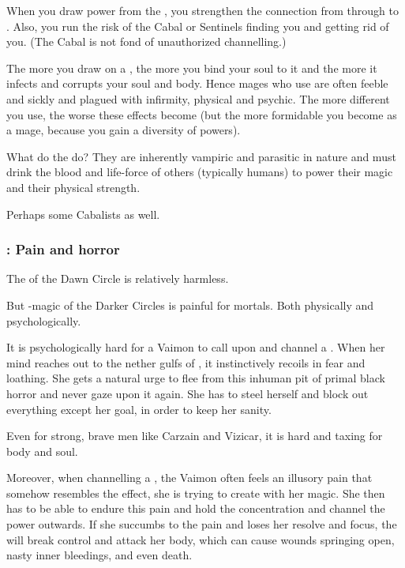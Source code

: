 When you draw power from the \qliphoth, you strengthen the connection from \Miith{} through  to . 
Also, you run the risk of the Cabal or Sentinels finding you and getting rid of you. 
(The Cabal is not fond of unauthorized  channelling.)

The more you draw on a \qliphah, the more you bind your soul to it and the more it infects and corrupts your soul and body.
Hence mages who use \itzach are often feeble and sickly and plagued with infirmity, physical and psychic.
The more different \qliphoth you use, the worse these effects become (but the more formidable you become as a mage, because you gain a diversity of powers). 

What do the  do? They are inherently vampiric and parasitic in nature and must drink the blood and life-force of others (typically humans) to power their magic and their physical strength. 

Perhaps some Cabalists  as well.





\subsubsection{\Itzach: Pain and horror}
The \qliphoth{} of the Dawn Circle is relatively harmless. 

But \qliphah-magic of the Darker Circles is painful for mortals. 
Both physically and psychologically. 

It is psychologically hard for a Vaimon to call upon and channel a \qliphah{}. 
When her mind reaches out to the nether gulfs of \Itzach, it instinctively recoils in fear and loathing. 
She gets a natural urge to flee from this inhuman pit of primal black horror and never gaze upon it again. 
She has to steel herself and block out everything except her goal, in order to keep her sanity. 

Even for strong, brave men like Carzain and Vizicar, it is hard and taxing for body and soul. 

Moreover, when channelling a \qliphah, the Vaimon often feels an illusory pain that somehow resembles the effect, she is trying to create with her magic.   
She then has to be able to endure this pain and hold the concentration and channel the power outwards. 
If she succumbs to the pain and loses her resolve and focus, the \qliphah{} will break control and attack her body, which can cause wounds springing open, nasty inner bleedings, and even death. 

